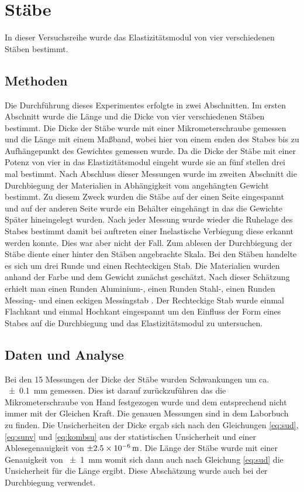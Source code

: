 \section{Stäbe}
In dieser Versuchsreihe wurde das Elastizitätsmodul von vier verschiedenen Stäben bestimmt.
\subsection{Methoden}
Die Durchführung dieses Experimentes erfolgte in zwei Abschnitten.
Im ersten Abschnitt wurde die Länge und die Dicke von vier verschiedenen Stäben bestimmt.
Die Dicke der Stäbe wurde mit einer Mikrometerschraube gemessen und die Länge mit einem Maßband, wobei hier von einem enden des Stabes bis zu Aufhängepunkt des Gewichtes gemessen wurde.
Da die Dicke der Stäbe mit einer Potenz von vier in das Elastizitätsmodul eingeht wurde sie an fünf stellen drei mal bestimmt.  Nach Abschluss dieser Messungen wurde im zweiten Abschnitt die Durchbiegung der Materialien in Abhängigkeit vom angehängten Gewicht bestimmt. Zu diesem Zweck wurden die Stäbe auf der einen Seite eingespannt und auf der anderen Seite wurde ein Behälter eingehängt in das die Gewichte Später hineingelegt wurden.
Nach jeder Messung wurde wieder die Ruhelage des Stabes bestimmt damit bei auftreten einer Inelastische Verbiegung diese erkannt werden konnte. Dies war aber nicht der Fall. Zum ablesen der Durchbiegung der Stäbe diente einer hinter den Stäben angebrachte Skala.
Bei den Stäben handelte es sich um drei Runde und einen Rechteckigen Stab. Die Materialien wurden anhand der Farbe und dem Gewicht zunächst geschätzt.
Nach dieser Schätzung erhielt man einen Runden Aluminium-, einen Runden Stahl-, einen Runden Messing- und einen eckigen Messingstab . Der Rechteckige Stab wurde einmal Flachkant und einmal Hochkant eingespannt um den Einfluss der Form eines Stabes auf die Durchbiegung und das Elastizitätsmodul zu untersuchen.

\subsection{Daten und Analyse}
Bei  den 15 Messungen der Dicke der Stäbe wurden Schwankungen um ca. \SI{+-0,1}{mm} gemessen. Dies ist darauf zurückzuführen das die Mikrometerschraube von Hand festgezogen wurde und dem entsprechend nicht immer mit der Gleichen Kraft.
Die genauen Messungen sind in dem Laborbuch zu finden. Die Unsicherheiten der Dicke ergab sich nach den Gleichungen \ref{eq:sud}, \ref{eq:sunv} und \ref{eq:kombsu} aus der statistischen Unsicherheit und einer Ablesegenauigkeit von $\SI{\pm 2.5e-6}{m}$.   
Die Länge der Stäbe wurde mit einer Genauigkeit von \SI{+-1}{mm} womit sich dann auch nach Gleichung \ref{eq:sud} die Unsicherheit für die Länge ergibt. Diese Abschätzung wurde auch bei der Durchbiegung verwendet.

